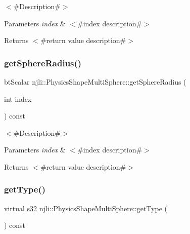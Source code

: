 $<$\#\+Description\#$>$


\begin{DoxyParams}{Parameters}
{\em index} & $<$\#index description\#$>$\\
\hline
\end{DoxyParams}
\begin{DoxyReturn}{Returns}
$<$\#return value description\#$>$ 
\end{DoxyReturn}
\mbox{\label{classnjli_1_1_physics_shape_multi_sphere_a6833432afbb47a8800e3bbd12999954a}} 
\subsubsection{\texorpdfstring{get\+Sphere\+Radius()}{getSphereRadius()}}
{\footnotesize\ttfamily bt\+Scalar njli\+::\+Physics\+Shape\+Multi\+Sphere\+::get\+Sphere\+Radius (\begin{DoxyParamCaption}\item[{int}]{index }\end{DoxyParamCaption}) const}

$<$\#\+Description\#$>$


\begin{DoxyParams}{Parameters}
{\em index} & $<$\#index description\#$>$\\
\hline
\end{DoxyParams}
\begin{DoxyReturn}{Returns}
$<$\#return value description\#$>$ 
\end{DoxyReturn}
\mbox{\label{classnjli_1_1_physics_shape_multi_sphere_abfd5533159ecea36c3f9147b49dfe7c2}} 
\subsubsection{\texorpdfstring{get\+Type()}{getType()}}
{\footnotesize\ttfamily virtual \mbox{\hyperlink{_util_8h_aa62c75d314a0d1f37f79c4b73b2292e2}{s32}} njli\+::\+Physics\+Shape\+Multi\+Sphere\+::get\+Type (\begin{DoxyParamCaption}{ }\end{DoxyParamCaption}) const\hspace{0.3cm}{\ttfamily [virtual]}}

